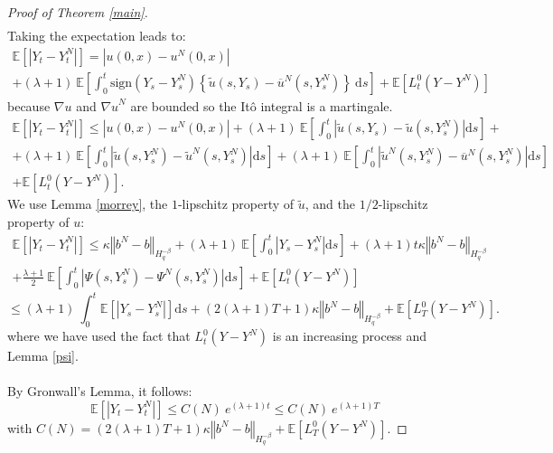 \documentclass[11pt]{article}
\newcommand{\norme}[1]{\left\Vert #1\right\Vert}
\newcommand{\E}{\mathbb{E}}
\newcommand{\di}{\mathrm{d}}
\begin{document}
\begin{proof}[Proof of Theorem \ref{main}]
\begin{multline*}
    \end{multline*}    
    Taking the expectation leads to:
    \begin{multline*}
    \E\left[\left|Y_t-Y_t^N\right|\right] =  \left|u(0,x)-u^N(0,x)\right|\\ + (\lambda + 1)\ \E\left[\int_0^t\mathrm{sign}(Y_s-Y_s^N)\left\{\widetilde{u}\left(s,Y_s\right)-\overline{u}^N\left(s,Y_s^N\right)\right\}\ \di s\right] + \E \left[L_t^0(Y-Y^N)\right]
    \end{multline*}
    because ${\nabla u}$ and ${\nabla u}^N$ are bounded so the Itô integral is a martingale.    
    \begin{multline*}
    \E\left[\left|Y_t-Y_t^N\right|\right]\leq \left|u(0,x)-u^N(0,x)\right| + (\lambda + 1)\ \E\left[\int_0^t\left|\widetilde{u}\left(s,Y_s\right)-\widetilde{u}\left(s,Y_s^N\right)\right| \di s\right]+ \\ + (\lambda + 1)\ \E\left[\int_0^t\left|\widetilde{u}\left(s,Y_s^N\right)-\widetilde{u}^N\left(s,Y_s^N\right)\right| \di s\right] + (\lambda + 1)\ \E\left[\int_0^t\left|\widetilde{u}^N\left(s,Y_s^N\right)-\overline{u}^N\left(s,Y_s^N\right)\right| \di s\right]\\ + \E \left[L_t^0(Y-Y^N)\right].
    \end{multline*}
    We use Lemma \ref{morrey}, the $1$-lipschitz property of $\widetilde{u}$, and the $1/2$-lipschitz property of $u$:
    \begin{multline*}
    \E\left[\left|Y_t-Y_t^N\right|\right]\leq \kappa\norme{b^N-b}_{H^{-\beta}_{q}} + (\lambda + 1)\ \E\left[\int_0^t\left|Y_s-Y_s^N\right| \di s\right] + (\lambda + 1)t\kappa\norme{b^N-b}_{H^{-\beta}_{q}}\\+ \frac{\lambda + 1}{2}\ \E\left[\int_0^t\left|\Psi\left(s,Y_s^N\right)-\Psi^N\left(s,Y_s^N\right)\right| \di s\right]  + \E \left[L_t^0(Y-Y^N)\right]
    \end{multline*}    
    \begin{equation*}
    \leq (\lambda + 1)\ \int_0^t\E\left[\left|Y_s-Y_s^N\right|\right] \di s + (2(\lambda + 1)T+1)\kappa\norme{b^N-b}_{H^{-\beta}_{q}}  + \E \left[L_T^0(Y-Y^N)\right].
    \end{equation*}
    where we have used the fact that $L_t^0(Y-Y^N)$ is an increasing process and Lemma \ref{psi}.    
    \paragraph{}
    By Gronwall's Lemma, it follows:
    \begin{equation}\label{gronwall}
    \E\left[\left|Y_t-Y_t^N\right|\right] \leq C(N)\ e^{(\lambda + 1)t}\leq C(N)\ e^{(\lambda + 1)T}
    \end{equation}
    with $C(N) = (2(\lambda + 1)T+1)\kappa\norme{b^N-b}_{H^{-\beta}_{q}}  + \E \left[L_T^0(Y-Y^N)\right].$      
    

\end{proof}
\end{document}
